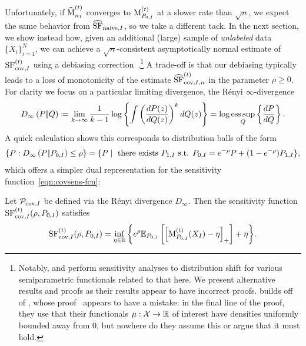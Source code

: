 Unfortunately, if
$\widehat{\operatorname*{M}}_{n_1}^{(t)}$ converges to
$\operatorname*{M}_{P_{0,I}}^{(t)}$ at a slower rate than $\sqrt{n}$, we
expect the same behavior from $\widehat{\operatorname*{SF}}_{\textup{naive}, I}$, so we take a
different tack.
%
In the next section, we show instead how, given an additional (large)
sample of \emph{unlabeled} data $\{X_i\}_{i = 1}^N$, we can achieve a
$\sqrt{n}$-consistent asymptotically normal estimate of ${\operatorname*{SF}}_{\textup{cov}, I}^{(t)}$ using a
debiasing correction~\citep{ChernozhukovChDeDuHaNeRo16,
  JeongNa20,SubbaswamyAdSa21}.\footnote{\label{footnote:hong-wrong}
Notably, \citet{JeongNa20} and
\citet{SubbaswamyAdSa21} perform sensitivity analyses to distribution shift
for various semiparametric functionals related to that here. We present
alternative results and proofs as their results appear to have incorrect
proofs. \citet[Thm.~1]{SubbaswamyAdSa21} builds off of \citet[Lemma
  14]{JeongNa20}, whose proof~\cite[Appendix C.3]{JeongNa20} appears to have
a mistake: in the final line of the proof, they use that their functionals
$\mu : \mathcal{X} \to \mathbb{R}$ of interest have densities uniformly bounded away from
0, but nowhere do they assume this or argue that it must hold.}
A trade-off is that our debiasing typically leads to a loss
of monotonicity of the
estimate $\widehat{\operatorname*{SF}}_{\text{cov}, I, n}^{(t)}$ in the parameter
$\rho \ge 0$. For
clarity we focus on a particular limiting divergence, the
R\'{e}nyi $\infty$-divergence
\begin{align*}
  D_{\infty}\left({P} |\!| {Q}\right) \coloneqq \lim_{k \to \infty} \frac{1}{k-1} \log \left\{ \int \left( \frac{dP(z)}{dQ(z)} \right)^k dQ(z) \right\} = \log \operatorname*{ess\,sup}_Q \left\{ \frac{dP}{dQ} \right\}.
\end{align*}
A quick calculation shows this corresponds to distribution balls of the form  
\begin{align*}
  \{ P : D_{\infty}\left({P} |\!| {P_{0,I}}\right) \le \rho \} = \{P \mid
  \text{ there exists } P_{1, I}  \text{ s.t. } P_{0,I} = e^{-\rho} P +(1-e^{-\rho})P_{1,I} \},
\end{align*}
which offers a simpler dual representation for the sensitivity
function~\eqref{eqn:covsens-fcn}:
\begin{lemma}
  \label{lemma:cvar-calc}
  Let $\mathcal{P}_{\textup{cov},I}$ be defined via the
  R\'{e}nyi divergence $D_\infty$.
  Then the sensitivity function ${\operatorname*{SF}}_{\textup{cov}, I}^{(t)} (\rho, P_{0,I})$ satisfies
  \begin{align*}
    {\operatorname*{SF}}_{\textup{cov}, I}^{(t)} (\rho, P_{0,I}) =\inf_{\eta \in \mathbb{R}} \bigg\{
    e^{\rho}\mathbb{E}_{P_{0,I}}
    \left[
      \left[{{\operatorname*{M}}_{P_{0,I}}^{(t)}(X_I)-\eta}\right]_+
      \right] +\eta
    \bigg\}.
  \end{align*}
\end{lemma}

